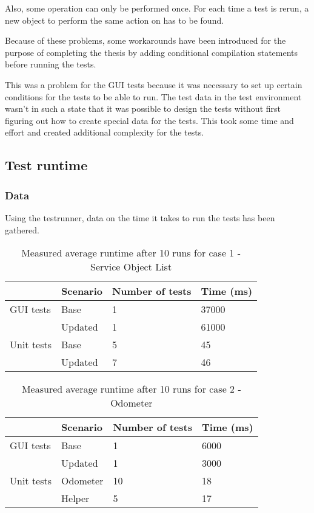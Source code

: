 \documentclass{article}
\begin{document}
			 Also, some operation can only be performed once. For each time a test is rerun, a new object to perform the same action on has to be found.

			 Because of these problems, some workarounds have been introduced for the purpose of completing the thesis by adding conditional compilation statements before running the tests.

 			 This was a problem for the GUI tests because it was necessary to set up certain conditions for the tests to be able to run. The test data in the test environment wasn't in such a state that it was possible to design the tests without first figuring out how to create special data for the tests. This took some time and effort and created additional complexity for the tests. 


		\subsection{Test runtime}

			\subsubsection{Data}
			Using the testrunner, data on the time it takes to run the tests has been gathered. 

			\begin{table}[h!]
				\begin{tabular}{l |l |l l}
				        & Scenario & Number of tests & Time (ms)\\
				\hline
				 GUI tests & Base     & 1               & 37000 \\
				        & Updated  & 1    			 & 61000 \\
				\hline
				 Unit tests & Base     & 5               & 45 \\
				 		& Updated  & 7               & 46 \\
				 \end{tabular}
				 \caption{Measured average runtime after 10 runs for case 1 - Service Object List}
			 \end{table}


			\begin{table}[h!]
				\begin{tabular}{l |l |l l}
				        & Scenario & Number of tests & Time (ms)\\
				\hline
				GUI tests & Base     & 1           & 6000 \\
				           & Updated  & 1    		& 3000 \\
				\hline
				Unit tests & Odometer & 10         & 18 \\
				 		& Helper      & 5           & 17 \\
				\end{tabular}
				\caption{Measured average runtime after 10 runs for case 2 - Odometer}
			\end{table}
\end{document}
